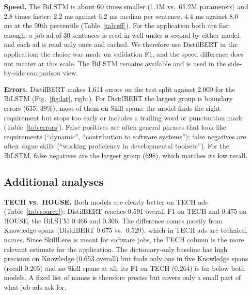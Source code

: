 \documentclass[runningheads]{llncs}
\begin{document}
\textbf{Speed.} The BiLSTM is about 60 times smaller (1.1M vs.\ 65.2M parameters) and 2.8 times faster:
2.2 ms against 6.2 ms median per sentence, 4.4 ms against 8.0 ms at the 90th percentile
(Table~\ref{tab:eff}). For the application both are fast enough: a job ad of 30 sentences is read in
well under a second by either model, and each ad is read only once and cached. We therefore use
DistilBERT in the application; the choice was made on validation F1, and the speed difference does not
matter at this scale. The BiLSTM remains available and is used in the side-by-side comparison view.

\textbf{Errors.} DistilBERT makes 1,611 errors on the test split against 2,000 for the BiLSTM
(Fig.~\ref{fig:lat}, right). For DistilBERT the largest group is boundary errors (635, 39\%), most of
them on Skill spans: the model finds the right requirement but stops too early or includes a trailing
word or punctuation mark (Table~\ref{tab:errors}). False positives are often general phrases that look
like requirements (``dynamic'', ``contribution to software systems''); false negatives are often vague
skills (``working proficiency in developmental toolsets''). For the BiLSTM, false negatives are the
largest group (698), which matches its low recall.

\begin{table}[t]
\centering
\caption{Real DistilBERT errors from the test split (\texttt{results/errors\_distilbert.jsonl}).}
\label{tab:errors}
\resizebox{\textwidth}{!}{}
\end{table}

\subsection{Additional analyses}

\begin{table}[t]
\centering
\caption{Test F1 separately for TECH and HOUSE job ads (mean $\pm$ std over seeds 42, 13, 7; the
dictionary baseline is deterministic). Produced by \texttt{scripts/analyze\_by\_source.py}.}
\label{tab:source}
\resizebox{\textwidth}{!}{}
\end{table}

\textbf{TECH vs.\ HOUSE.} Both models are clearly better on TECH ads (Table~\ref{tab:source}):
DistilBERT reaches 0.591 overall F1 on TECH and 0.475 on HOUSE, the BiLSTM 0.466 and 0.306. The
difference comes mostly from Knowledge spans (DistilBERT 0.675 vs.\ 0.529), which in TECH ads are
technical names. Since SkillLens is meant for software jobs, the TECH column is the more relevant
estimate for the application. The dictionary-only baseline has high precision on Knowledge (0.653
overall) but finds only one in five Knowledge spans (recall 0.205) and no Skill spans at all; its F1
on TECH (0.264) is far below both models. A fixed list of names is therefore precise but covers only a
small part of what job ads ask for.
\end{document}
